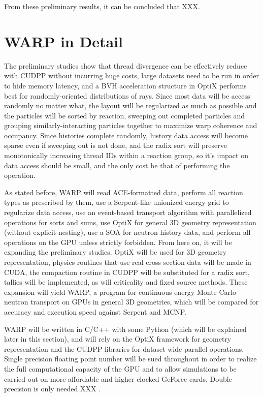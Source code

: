 From these preliminary results, it can be concluded that XXX.



\section{WARP in Detail}

The preliminary studies show that thread divergence can be effectively reduce with CUDPP without incurring huge costs, large datasets need to be run in order to hide memory latency, and a BVH acceleration structure in OptiX performs best for randomly-oriented distributions of rays.  Since most data will be access randomly no matter what, the layout will be regularized as much as possible and the particles will be sorted by reaction, sweeping out completed particles and grouping similarly-interacting particles together to maximize warp coherence and occupancy.  Since histories complete randomly, history data access will become sparse even if sweeping out is not done, and the radix sort will preserve monotonically increasing thread IDs within a reaction group, so it's impact on data access should be small, and the only cost be that of performing the operation.

As stated before, WARP will read ACE-formatted data, perform all reaction types as prescribed by them, use a Serpent-like unionized energy grid to regularize data access, use an event-based transport algorithm with parallelized operations for sorts and sums, use OptiX for general 3D geometry representation (without explicit nesting), use a SOA for neutron history data, and perform all operations on the GPU unless strictly forbidden.  From here on, it will be expanding the preliminary studies.  OptiX will be used for 3D geometry representation, physics routines that use real cross section data will be made in CUDA, the compaction routine in CUDPP will be substituted for a radix sort, tallies will be implemented, as will criticality and fixed source methods.  These expansion will yield WARP, a program for continuous energy Monte Carlo neutron transport on GPUs in general 3D geometries, which will be compared for accuracy and execution speed against Serpent and MCNP.

WARP will be written in C/C++ with some Python (which will be explained later in this section), and will rely on the OptiX framework for geometry representation and the CUDPP libraries for dataset-wide parallel operations. Single precision floating point number will be sued throughout in order to realize the full computational capacity of the GPU and to allow simulations to be carried out on more affordable and higher clocked GeForce cards.  Double precision is only needed XXX \cite{please}.

